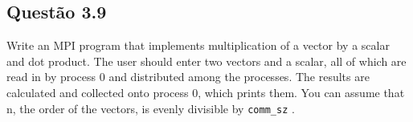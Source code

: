 

\subsection{Questão 3.9}

Write an MPI program that implements multiplication of a vector by a scalar and dot product. The user should enter two vectors and a scalar, all of which are read in by process 0 and distributed among the processes. The results are calculated and collected onto process 0, which prints them. You can assume that n, the order of the vectors, is evenly divisible by \texttt{comm\_sz} .\\


